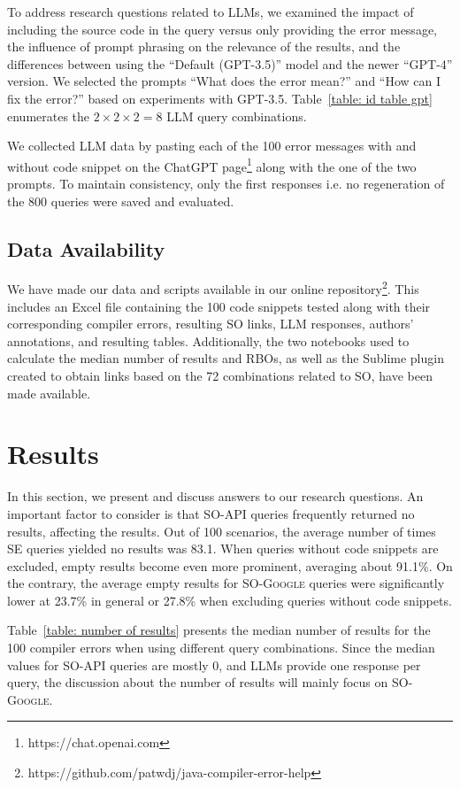 \documentclass[preprint,12pt]{elsarticle}
\begin{document}
To address research questions related to LLMs, we examined the impact of including the source code in the query versus only providing the error message, the influence of prompt phrasing on the relevance of the results, and the differences between using the ``Default (GPT-3.5)'' model and the newer ``GPT-4'' version. We selected the prompts ``What does the error mean?'' and ``How can I fix the error?'' based on experiments with GPT-3.5. Table~\ref{table: id table gpt} enumerates the $2\times2\times2=8$ LLM query combinations.

We collected LLM data by pasting each of the 100 error messages with and without code snippet on the ChatGPT page\footnote{https://chat.openai.com} along with the one of the two prompts. To maintain consistency, only the first responses i.e. no regeneration of the 800 queries were saved and evaluated.

\subsection{Data Availability}

We have made our data and scripts available in our online repository\footnote{https://github.com/patwdj/java-compiler-error-help}. This includes an Excel file containing the 100 code snippets tested along with their corresponding compiler errors, resulting SO links, LLM responses, authors' annotations, and resulting tables. Additionally, the two notebooks used to calculate the median number of results and RBOs, as well as the Sublime plugin created to obtain links based on the 72 combinations related to SO, have been made available.

\section{Results}
\label{sec:results}

In this section, we present and discuss answers to our research questions. An important factor to consider is that \textsc{SO-API} queries frequently returned no results, affecting the results. Out of 100 scenarios, the average number of times SE queries yielded no results was 83.1. When queries without code snippets are excluded, empty results become even more prominent, averaging about 91.1\%. On the contrary, the average empty results for \textsc{SO-Google} queries were significantly lower at 23.7\% in general or 27.8\% when excluding queries without code snippets. 

Table~\ref{table: number of results} presents the median number of results for the 100 compiler errors when using different query combinations. Since the median values for \textsc{SO-API} queries are mostly 0, and LLMs provide one response per query, the discussion about the number of results will mainly focus on \textsc{SO-Google}.
\end{document}
